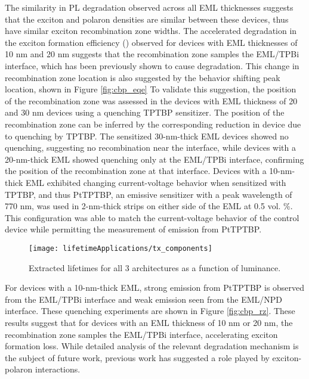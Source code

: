 \documentclass[../thesis.tex]{subfiles}
\begin{document}
The similarity in PL degradation observed across all EML thicknesses suggests that the exciton and polaron densities are similar between these devices,\supercite{Giebink2008a,Coburn2017,Lee2017} thus have similar exciton recombination zone widths.  
The accelerated degradation in the exciton formation efficiency (\ef) observed for devices with EML thicknesses of 10 nm and 20 nm suggests that the recombination zone samples the EML/TPBi interface, which has been previously shown to cause degradation.\supercite{Wang2013,Wang2014}
This change in recombination zone location is also suggested by the \eqe behavior shifting peak location, shown in Figure \ref{fig:cbp_eqe}
To validate this suggestion, the position of the recombination zone was assessed in the devices with EML thickness of 20 and 30 nm devices using a quenching TPTBP sensitizer.  
The position of the recombination zone can be inferred by the corresponding reduction in device \eqe due to quenching by TPTBP.\supercite{Erickson2013a}
The sensitized 30-nm-thick EML devices showed no quenching, suggesting no recombination near the interface, while devices with a 20-nm-thick EML showed quenching only at the EML/TPBi interface, confirming the position of the recombination zone at that interface.  
Devices with a 10-nm-thick EML exhibited changing current-voltage behavior when sensitized with TPTBP, and thus PtTPTBP, an emissive sensitizer with a peak wavelength of 770 nm, was used in 2-nm-thick strips on either side of the EML at 0.5 vol. \%.
This configuration was able to match the current-voltage behavior of the control device while permitting the measurement of emission from PtTPTBP.  
\begin{wrapfigure}{r}{.5\textwidth}
\centering
\texttt{[image: lifetimeApplications/tx\_components]}
\caption{Extracted lifetimes for all 3 architectures as a function of luminance.}
\label{fig:tx_components}
\end{wrapfigure}
For devices with a 10-nm-thick EML, strong emission from PtTPTBP is observed from the EML/TPBi interface and weak emission seen from the EML/NPD interface. 
These quenching experiments are shown in Figure \ref{fig:cbp_rz}.
These results suggest that for devices with an EML thickness of 10 nm or 20 nm, the recombination zone samples the EML/TPBi interface, accelerating exciton formation loss.  
While detailed analysis of the relevant degradation mechanism is the subject of future work, previous work has suggested a role played by exciton-polaron interactions.\supercite{Wang2015a,Zhang2016,Giebink2008a,Kondakov2007d,Kondakov2003}
\end{document}
